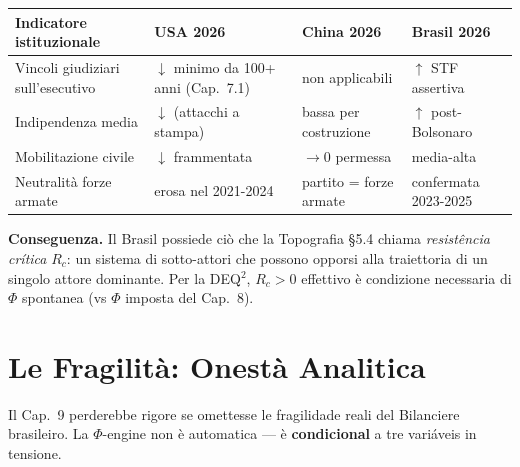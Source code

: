 {\def\LTcaptype{none} %
{\small\begin{longtable}[]{@{}
  >{\raggedright\arraybackslash}p{}
  >{\raggedright\arraybackslash}p{}
  >{\raggedright\arraybackslash}p{}
  >{\raggedright\arraybackslash}p{}@{}}
\toprule\noalign{}
\begin{minipage}[b]{\linewidth}\raggedright
Indicatore istituzionale
\end{minipage} & \begin{minipage}[b]{\linewidth}\raggedright
USA 2026
\end{minipage} & \begin{minipage}[b]{\linewidth}\raggedright
China 2026
\end{minipage} & \begin{minipage}[b]{\linewidth}\raggedright
Brasil 2026
\end{minipage} \\
\midrule\noalign{}
\endhead
\bottomrule\noalign{}
\endlastfoot
Vincoli giudiziari sull'esecutivo & \(\downarrow\) minimo da 100+ anni
(Cap.~7.1) & non applicabili & \(\uparrow\) STF assertiva \\
Indipendenza media & \(\downarrow\) (attacchi a stampa) & bassa per
costruzione & \(\uparrow\) post-Bolsonaro \\
Mobilitazione civile & \(\downarrow\) frammentata & \(\to 0\) permessa &
media-alta \\
Neutralità forze armate & erosa nel 2021-2024 & partito = forze armate &
confermata 2023-2025 \\
\end{longtable}}
}

\Proved{} \textbf{Conseguenza.} Il Brasil possiede ciò che la
Topografia \S{}5.4 chiama \emph{resistência crítica} \(R_c\): un sistema di
sotto-attori che possono opporsi alla traiettoria di un singolo attore
dominante. Per la DEQ$^2$, \(R_c > 0\) effettivo è condizione necessaria di
\(\Phi\) spontanea (vs \(\Phi\) imposta del Cap.~8).



\section{Le Fragilità: Onestà
Analitica}\label{le-fragilituxe0-onestuxe0-analitica}

Il Cap.~9 perderebbe rigore se omettesse le fragilidade reali del
Bilanciere brasileiro. La \(\Phi\)-engine non è automatica --- è
\textbf{condicional} a tre variáveis in tensione.

